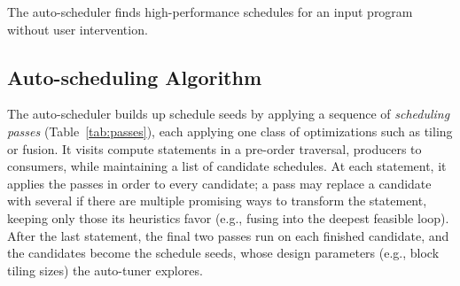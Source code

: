 The \NAME{} auto-scheduler finds high-performance schedules for an input program without
user intervention. 

\subsection{Auto-scheduling Algorithm}\label{sec:autosched-alg}
The auto-scheduler builds up schedule seeds by applying a sequence of \emph{scheduling passes}
(Table~\ref{tab:passes}), each applying one class of optimizations such as tiling or fusion.
It visits compute statements in a pre-order traversal, producers to consumers,
while maintaining a list of candidate schedules.
At each statement, it applies the passes in order to every candidate;
a pass may replace a candidate with several if there are multiple promising ways
to transform the statement, keeping only those its heuristics favor
(e.g., fusing into the deepest feasible loop).
After the last statement, the final two passes run on each finished candidate,
and the candidates become the schedule seeds,
whose design parameters (e.g., block tiling sizes) the auto-tuner explores.

